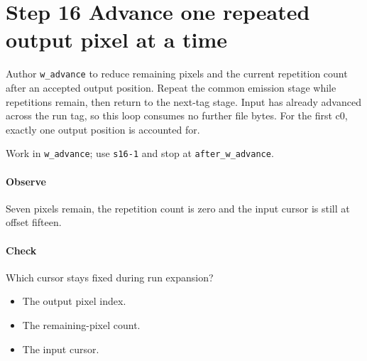 \section{Step 16 Advance one repeated output pixel at a time}\label{qoi-s16}
Author \texttt{w\_advance} to reduce remaining pixels and the current repetition count after an accepted output position. Repeat the common emission stage while repetitions remain, then return to the next-tag stage. Input has already advanced across the run tag, so this loop consumes no further file bytes. For the first c0, exactly one output position is accounted for.

Work in \texttt{w\_advance}; use \texttt{s16-1} and stop at \texttt{after\_w\_advance}.

\paragraph{Observe} Seven pixels remain, the repetition count is zero and the input cursor is still at offset fifteen.

\paragraph{Check} Which cursor stays fixed during run expansion?
\begin{itemize}
  \item[A.] The output pixel index.
  \item[B.] The remaining-pixel count.
  \item[C.] The input cursor.
\end{itemize}
